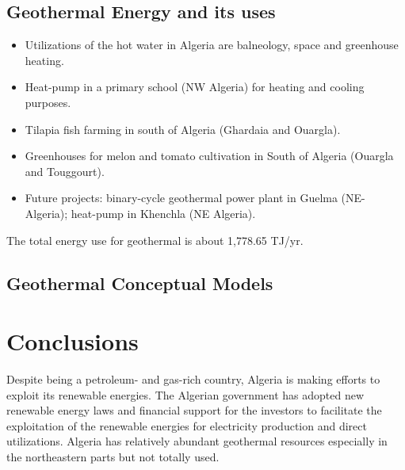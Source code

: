 \documentclass[a0,portrait]{a0poster}
\begin{document}
\begin{multicols}{3}
\subsection*{Geothermal Energy and its uses}
\begin{itemize}
\item Utilizations of the hot water in Algeria are balneology, space and greenhouse heating.
\item Heat-pump in a primary school (NW Algeria) for heating and cooling purposes.
\item Tilapia fish farming in south of Algeria (Ghardaia and Ouargla).
\item Greenhouses for melon and tomato cultivation in South of Algeria (Ouargla and Touggourt).
\item Future projects: binary-cycle geothermal power plant in Guelma (NE-Algeria); heat-pump in Khenchla (NE Algeria).
\end{itemize}
The total energy use for geothermal is about 1,778.65 TJ/yr.

\begin{center}\vspace{1cm}
\end{center}\vspace{1cm}

\subsection*{Geothermal Conceptual Models}


\color{SaddleBrown} %

\section*{Conclusions}
Despite being a petroleum- and gas-rich country, Algeria is making efforts to exploit its renewable energies. The Algerian government has adopted new renewable energy laws and financial support for the investors to facilitate the exploitation of the renewable energies for electricity production and direct utilizations. Algeria has relatively abundant geothermal resources especially in the northeastern parts but not totally used.
\color{Black} %


\end{multicols}
\end{document}
